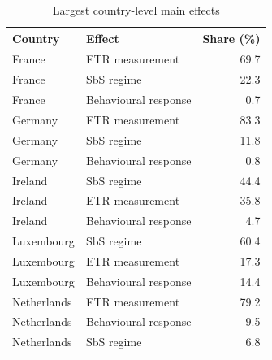 \begin{table}[H]
\centering
\footnotesize
\setlength{\tabcolsep}{3pt}
\caption{Largest country-level main effects}
\label{tab:app_stage46_country_anova}
\begin{tabular}{@{}llr@{}}
\toprule
Country & Effect & Share (\%) \\
\midrule
France & ETR measurement & 69.7 \\
France & SbS regime & 22.3 \\
France & Behavioural response &  0.7 \\
Germany & ETR measurement & 83.3 \\
Germany & SbS regime & 11.8 \\
Germany & Behavioural response &  0.8 \\
Ireland & SbS regime & 44.4 \\
Ireland & ETR measurement & 35.8 \\
Ireland & Behavioural response &  4.7 \\
Luxembourg & SbS regime & 60.4 \\
Luxembourg & ETR measurement & 17.3 \\
Luxembourg & Behavioural response & 14.4 \\
Netherlands & ETR measurement & 79.2 \\
Netherlands & Behavioural response &  9.5 \\
Netherlands & SbS regime &  6.8 \\
\bottomrule
\end{tabular}
\end{table}
